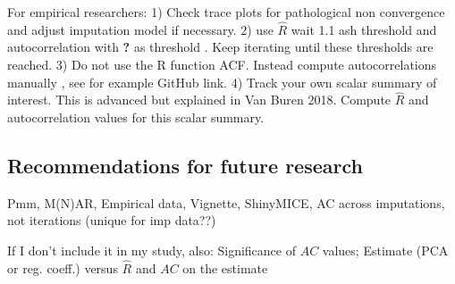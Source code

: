 \documentclass[Royal,times,sageh]{sagej}
\begin{document}
For empirical researchers: 1) Check trace plots for pathological non
convergence and adjust imputation model if necessary. 2) use
\(\widehat{R}\) wait 1.1 ash threshold and autocorrelation with
\textbf{?} as threshold . Keep iterating until these thresholds are
reached. 3) Do not use the R function ACF. Instead compute
autocorrelations manually , see for example GitHub link. 4) Track your
own scalar summary of interest. This is advanced but explained in Van
Buren 2018. Compute \(\widehat{R}\) and autocorrelation values for this
scalar summary.

\hypertarget{recommendations-for-future-research}{%
\subsection{Recommendations for future
research}\label{recommendations-for-future-research}}

Pmm, M(N)AR, Empirical data, Vignette, ShinyMICE, AC across imputations,
not iterations (unique for imp data??)

If I don't include it in my study, also: Significance of \(AC\) values;
Estimate (PCA or reg. coeff.) versus \(\widehat{R}\) and \(AC\) on the
estimate



\end{document}
